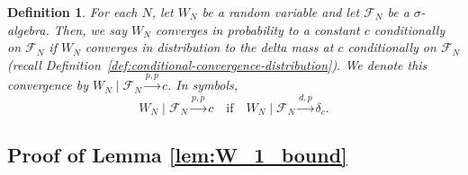 \documentclass[12pt]{article}
\newtheorem{definition}{Definition}
\newcommand{\convdp}{\overset {d,p} \longrightarrow}    %
\newcommand{\convpp}{\overset {p,p} \longrightarrow}    %
\begin{document}
\begin{definition} \label{def:conditional-convergence-probability}
	For each $N$, let $W_N$ be a random variable and let $\mathcal F_N$ be a $\sigma$-algebra. Then, we say $W_N$ converges in probability to a constant $c$ conditionally on $\mathcal F_N$ if $W_N$ converges in distribution to the delta mass at $c$ conditionally on $\mathcal F_N$ (recall Definition~\ref{def:conditional-convergence-distribution}). We denote this convergence by ${W_N \mid \mathcal F_N \convpp c}$. In symbols, 
	\begin{equation}
		W_N \mid \mathcal F_N \convpp c \quad \text{if} \quad W_N \mid \mathcal F_N \convdp \delta_c.
	\end{equation}
\end{definition}



\subsection{Proof of Lemma \ref{lem:W_1_bound}}
\end{document}

